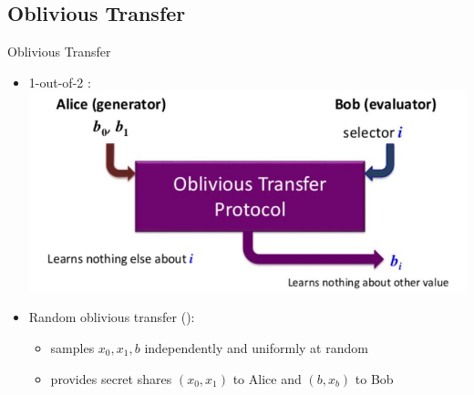 \subsection{Oblivious Transfer}
\begin{frame}{Oblivious Transfer}
	\begin{itemize}
		\item 1-out-of-2 \OT:
		\includegraphics[scale = 0.5]{OT-1}
		\item Random oblivious transfer (\ROT):
		\begin{itemize}
			\item samples $ x_0, x_1, b  $ independently and uniformly at random 
			\item provides secret shares $ (x_0, x_1) $ to Alice and $ (b, x_b) $ to Bob
		\end{itemize}
	\end{itemize}
\end{frame}

